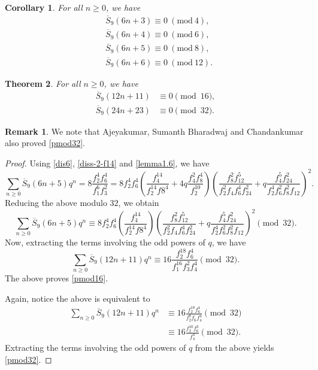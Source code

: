 \documentclass[12pt]{amsart}
\newcommand{\sst}{\overline{S}}
\theoremstyle{plain}
\newtheorem{theorem}{Theorem}[section]
\newtheorem{corollary}[theorem]{Corollary}
\theoremstyle{definition}
\newtheorem{remark}{Remark}[section]
\begin{document}
\begin{corollary}\label{ccr} For all $n\geq 0$, we have
\begin{align*}
 &\overline{S}_{9}(6n+3) \equiv 0 \ (\mathrm{mod} \ 4),\\
 &\overline{S}_{9}(6n+4) \equiv 0 \ (\mathrm{mod} \ 6),\\
 &\overline{S}_{9}(6n+5) \equiv 0 \ (\mathrm{mod} \ 8),\\
 &\overline{S}_{9}(6n+6) \equiv 0 \ (\mathrm{mod} \ 12).
\end{align*}
\end{corollary}


\begin{theorem}
For all $n\geq 0$, we have
\begin{align}
\sst_9(12n+11)&\equiv 0 \pmod{16},\label{pmod16}\\
\sst_9(24n+23)&\equiv 0 \pmod{32}.\label{pmod32}
\end{align}
\end{theorem}

\begin{remark}
We note that Ajeyakumar, Sumanth Bharadwaj and Chandankumar \cite[Eq. (3.12)]{arxiv} also proved \eqref{pmod32}.
\end{remark}

\begin{proof}
Using \eqref{dis6}, \eqref{diss-2-f14} and \eqref{lemma1.6}, we have
\[
\sum_{n\geq 0}\sst_9(6n+5)q^n=8\dfrac{f_{2}^{4} f_{6}^{4}}{f_{1}^{6} f_{3}^{2}}=8f_2^4f_6^4\left(\frac{f_4^{14}}{f_2^{14}f8^4}+4q\frac{f_4^2f_8^4}{f_2^{10}}\right)\left(\frac{f_{8}^{2} f_{12}^{5}}{f_{2}^{2} f_{4} f_{6}^{4} f_{24}^{2}}+q \frac{f_{4}^{5} f_{24}^{2}}{f_{2}^{4} f_{6}^{2} f_{8}^{2} f_{12}}\right)^2.
\]
Reducing the above modulo $32$, we obtain
\[
\sum_{n\geq 0}\sst_9(6n+5)q^n\equiv 8f_2^4f_6^4\left(\frac{f_4^{14}}{f_2^{14}f8^4}\right)\left(\frac{f_{8}^{2} f_{12}^{5}}{f_{2}^{2} f_{4} f_{6}^{4} f_{24}^{2}}+q \frac{f_{4}^{5} f_{24}^{2}}{f_{2}^{4} f_{6}^{2} f_{8}^{2} f_{12}}\right)^2 \pmod{32}.
\]
Now, extracting the terms involving the odd powers of $q$, we have
\[
\sum_{n\geq 0}\sst_9(12n+11)q^n\equiv 16\frac{f_2^{18}f_6^4}{f_1^{16}f_3^2f_4^4} \pmod{32}.
\]
The above proves \eqref{pmod16}.

Again, notice the above is equivalent to
\begin{align*}
\sum_{n\geq 0}\sst_9(12n+11)q^n &\equiv 16\frac{f_2^{18}f_6^4}{f_2^{8}f_6f_4^4} \pmod{32}\\
&\equiv 16\frac{f_2^{10}f_6^3}{f_4^4} \pmod{32}.
\end{align*}
Extracting the terms involving the odd powers of $q$ from the above yields \eqref{pmod32}.
\end{proof}
\end{document}
